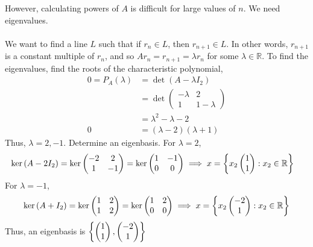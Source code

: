 \documentclass[letterpaper,12pt]{article}
\begin{document}
However, calculating powers of $A$ is difficult for large values of $n$. We need eigenvalues.
\\ \\ We want to find a line $L$ such that if $r_n \in L$, then $r_{n+1} \in L$. In other words, $r_{n+1}$ is a constant multiple of $r_n$, and so $Ar_n = r_{n+1} = \lambda r_n$ for some $\lambda \in \mathbb{R}$. To find the eigenvalues, find the roots of the characteristic polynomial,
\begin{align*}
    0 = P_{A}(\lambda) & = \det{(A - \lambda I_2)} \\
    & = \det{\begin{pmatrix} -\lambda & 2 \\ 1 & 1 - \lambda \end{pmatrix}} \\
    & = \lambda^2 - \lambda - 2 \\
    0 & = (\lambda - 2)(\lambda + 1)
\end{align*}
Thus, $\lambda = 2, -1$. Determine an eigenbasis. For $\lambda = 2$,
\begin{align*}
    \ker{(A - 2 I_2)} & = \ker{\begin{pmatrix} -2 & 2 \\ 1 & -1 \end{pmatrix}} = \ker{\begin{pmatrix} 1 & -1 \\ 0 & 0 \end{pmatrix}} \implies x = \left\{ x_2 \begin{pmatrix} 1 \\ 1 \end{pmatrix}: x_2 \in \mathbb{R} \right\}
\end{align*}
For $\lambda = -1$,
\begin{align*}
    \ker{(A + I_2)} = \ker{\begin{pmatrix} 1 & 2 \\ 1 & 2 \end{pmatrix}} = \ker{\begin{pmatrix} 1 & 2 \\ 0 & 0 \end{pmatrix}} \implies x = \left\{ x_2 \begin{pmatrix} -2 \\ 1 \end{pmatrix}: x_2 \in \mathbb{R} \right\}
\end{align*}
Thus, an eigenbasis is $\left\{ \begin{pmatrix} 1 \\ 1 \end{pmatrix}, \begin{pmatrix} -2 \\ 1 \end{pmatrix} \right\}$
\end{document}
